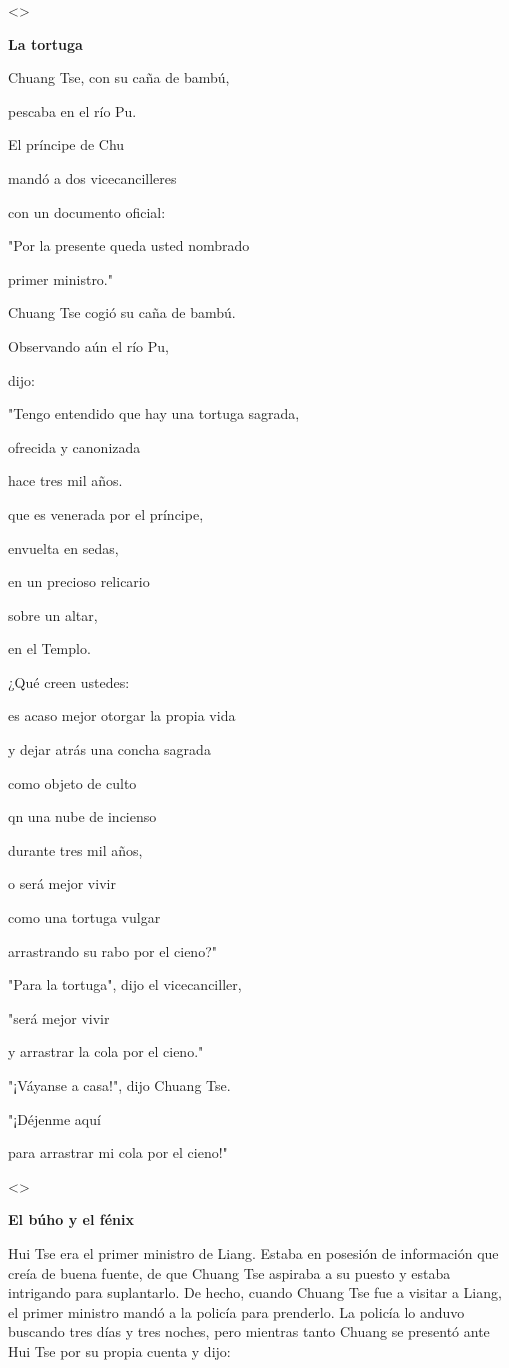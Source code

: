 \textless\textgreater{}

\textbf{{La tortuga}}

Chuang Tse, con su caña de bambú,

pescaba en el río Pu.

El príncipe de Chu

mandó a dos vicecancilleres

con un documento oficial:

"Por la presente queda usted nombrado

primer ministro."

Chuang Tse cogió su caña de bambú.

Observando aún el río Pu,

dijo:

"Tengo entendido que hay una tortuga sagrada,

ofrecida y canonizada

hace tres mil años.

que es venerada por el príncipe,

envuelta en sedas,

en un precioso relicario

sobre un altar,

en el Templo.

¿Qué creen ustedes:

es acaso mejor otorgar la propia vida

y dejar atrás una concha sagrada

como objeto de culto

qn una nube de incienso

durante tres mil años,

o será mejor vivir

como una tortuga vulgar

arrastrando su rabo por el cieno?"

"Para la tortuga", dijo el vicecanciller,

"será mejor vivir

y arrastrar la cola por el cieno."

"¡Váyanse a casa!", dijo Chuang Tse.

"¡Déjenme aquí

para arrastrar mi cola por el cieno!"

\textless\textgreater{}

\textbf{{El búho y el fénix}}

Hui Tse era el primer ministro de Liang. Estaba en posesión de
información que creía de buena fuente, de que Chuang Tse aspiraba a su
puesto y estaba intrigando para suplantarlo. De hecho, cuando Chuang Tse
fue a visitar a Liang, el primer ministro mandó a la policía para
prenderlo. La policía lo anduvo buscando tres días y tres noches, pero
mientras tanto Chuang se presentó ante Hui Tse por su propia cuenta y
dijo:

